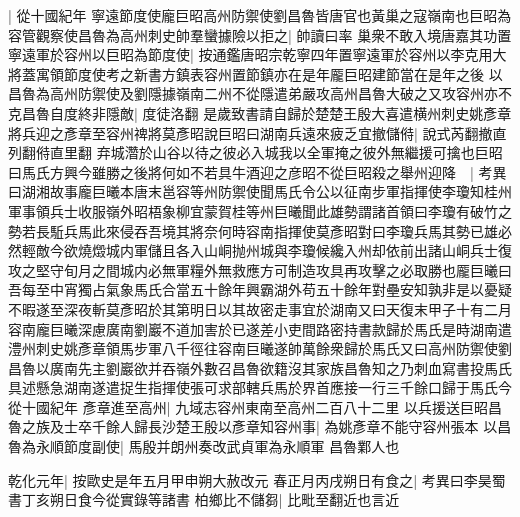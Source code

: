 |{
	從十國紀年}
寧遠節度使龐巨昭高州防禦使劉昌魯皆唐官也黃巢之寇嶺南也巨昭為容管觀察使昌魯為高州刺史帥羣蠻據險以拒之|{
	帥讀曰率}
巢衆不敢入境唐嘉其功置寧遠軍於容州以巨昭為節度使|{
	按通鑑唐昭宗乾寧四年置寧遠軍於容州以李克用大將蓋寓領節度使考之新書方鎮表容州置節鎮亦在是年龎巨昭建節當在是年之後}
以昌魯為高州防禦使及劉隱據嶺南二州不從隱遣弟嚴攻高州昌魯大破之又攻容州亦不克昌魯自度終非隱敵|{
	度徒洛翻}
是歲致書請自歸於楚楚王殷大喜遣横州刺史姚彥章將兵迎之彥章至容州禆將莫彥昭說巨昭曰湖南兵遠來疲乏宜撤儲偫|{
	說式芮翻撤直列翻偫直里翻}
弃城濳於山谷以待之彼必入城我以全軍掩之彼外無繼援可擒也巨昭曰馬氏方興今雖勝之後將何如不若具牛酒迎之彦昭不從巨昭殺之舉州迎降　|{
	考異曰湖湘故事龐巨曦本唐末邕容等州防禦使聞馬氏令公以征南步軍指揮使李瓊知桂州軍事領兵士收服嶺外昭梧象柳宜蒙賀桂等州巨曦聞此雄勢謂諸首領曰李瓊有破竹之勢若長駈兵馬此來侵吞吾境其將奈何時容南指揮使莫彥昭對曰李瓊兵馬其勢已雄必然輕敵今欲燒燬城内軍儲且各入山峒抛州城與李瓊候纔入州却依前出諸山峒兵士復攻之堅守旬月之間城内必無軍糧外無救應方可制造攻具再攻擊之必取勝也龎巨曦曰吾每至中宵獨占氣象馬氏合當五十餘年興霸湖外苟五十餘年對壘安知孰非是以憂疑不暇遂至深夜斬莫彥昭於其第明日以其故密走事宜於湖南又曰天復末甲子十有二月容南龐巨曦深慮廣南劉巖不道加害於已遂差小吏間路密持書款歸於馬氏是時湖南遣澧州刺史姚彥章領馬步軍八千徑往容南巨曦遂帥萬餘衆歸於馬氏又曰高州防禦使劉昌魯以廣南先主劉巖欲并吞嶺外數召昌魯欲籍沒其家族昌魯知之乃刺血寫書投馬氏具述懸急湖南遂遣捉生指揮使張可求部轄兵馬於界首應接一行三千餘口歸于馬氏今從十國紀年}
彥章進至高州|{
	九域志容州東南至高州二百八十二里}
以兵援送巨昭昌魯之族及士卒千餘人歸長沙楚王殷以彥章知容州事|{
	為姚彥章不能守容州張本}
以昌魯為永順節度副使|{
	馬殷并朗州奏改武貞軍為永順軍}
昌魯鄴人也

乾化元年|{
	按歐史是年五月甲申朔大赦改元}
春正月丙戌朔日有食之|{
	考異曰李昊蜀書丁亥朔日食今從實錄等諸書}
柏鄉比不儲芻|{
	比毗至翻近也言近}


